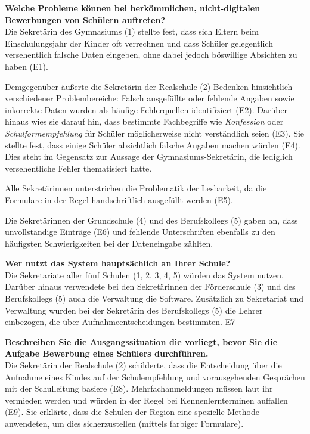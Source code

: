 \textbf{Welche Probleme können bei herkömmlichen, nicht-digitalen Bewerbungen von Schülern auftreten?}\\
Die Sekretärin des Gymnasiums (1) stellte fest, dass sich Eltern beim Einschulungsjahr der Kinder oft verrechnen und dass Schüler gelegentlich versehentlich falsche Daten eingeben, ohne dabei jedoch böswillige Absichten zu haben (E1). 

Demgegenüber äußerte die Sekretärin der Realschule (2) Bedenken hinsichtlich verschiedener Problembereiche: Falsch ausgefüllte oder fehlende Angaben sowie inkorrekte Daten wurden als häufige Fehlerquellen identifiziert (E2). Darüber hinaus wies sie darauf hin, dass bestimmte Fachbegriffe wie \textit{Konfession} oder \textit{Schulformempfehlung} für Schüler möglicherweise nicht verständlich seien (E3). Sie stellte fest, dass einige Schüler absichtlich falsche Angaben machen würden (E4). Dies steht im Gegensatz zur Aussage der Gymnasiums-Sekretärin, die lediglich versehentliche Fehler thematisiert hatte. 

Alle Sekretärinnen unterstrichen die Problematik der Lesbarkeit, da die Formulare in der Regel handschriftlich ausgefüllt werden (E5).

Die Sekretärinnen der Grundschule (4) und des Berufskollegs (5) gaben an, dass unvollständige Einträge (E6) und fehlende Unterschriften ebenfalls zu den häufigsten Schwierigkeiten bei der Dateneingabe zählten.


\textbf{Wer nutzt das System hauptsächlich an Ihrer Schule?}\\
Die Sekretariate aller fünf Schulen (1, 2, 3, 4, 5) würden das System nutzen. Darüber hinaus verwendete bei den Sekretärinnen der Förderschule (3) und des Berufskollegs (5) auch die Verwaltung die Software. Zusätzlich zu Sekretariat und Verwaltung wurden bei der Sekretärin des Berufskollegs (5) die Lehrer einbezogen, die über Aufnahmeentscheidungen bestimmten. E7 


\textbf{Beschreiben Sie die Ausgangssituation die vorliegt, bevor Sie die Aufgabe \glqq Bewerbung eines Schülers\grqq{} durchführen.}\\
Die Sekretärin der Realschule (2) schilderte, dass die Entscheidung über die Aufnahme eines Kindes auf der Schulempfehlung und vorausgehenden Gesprächen mit der Schulleitung basiere (E8). Mehrfachanmeldungen müssen laut ihr vermieden werden und würden in der Regel bei Kennenlernterminen auffallen (E9). Sie erklärte, dass die Schulen der Region eine spezielle Methode anwendeten, um dies sicherzustellen (mittels farbiger Formulare).

